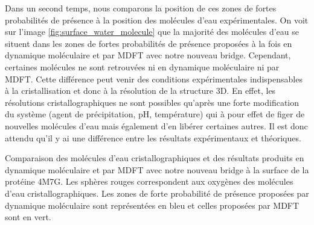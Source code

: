 Dans un second temps, nous comparons la position de ces zones de fortes probabilités de présence à la position des molécules d'eau expérimentales. On voit sur l'image \ref{fig:surface_water_molecule} que la majorité des molécules d'eau se situent dans les zones de fortes probabilités de présence proposées à la fois en dynamique moléculaire et par MDFT avec notre nouveau bridge. Cependant, certaines molécules ne sont retrouvées ni en dynamique moléculaire ni par MDFT. Cette différence peut venir des conditions expérimentales indispensables à la cristallisation et donc à la résolution de la structure 3D. En effet, les résolutions cristallographiques ne sont possibles qu'après une forte modification du système (agent de précipitation, pH, température) qui à pour effet de figer de nouvelles molécules d'eau mais également d'en libérer certaines autres. Il est donc attendu qu'il y ai une différence entre les résultats expérimentaux et théoriques.




\begin{center}
    \captionsetup{type=figure}
	 {Comparaison des molécules d'eau cristallographiques et des résultats produits en dynamique moléculaire et par MDFT avec notre nouveau bridge à la surface de la protéine 4M7G. Les sphères rouges correspondent aux oxygènes des molécules d'eau cristallographiques. Les zones de forte probabilité de présence proposées par dynamique moléculaire sont représentées en bleu et celles proposées par MDFT sont en vert.}
      \label{fig:surface_water_molecule}
\end{center}



